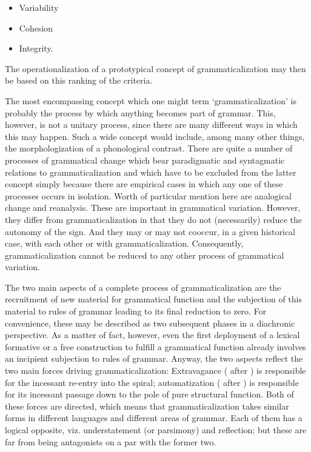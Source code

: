 \begin{itemize}
\item Variability
\item Cohesion
\item Integrity.
\end{itemize}

The operationalization of a prototypical concept of grammaticalization may then be based on this ranking of the criteria.

The most encompassing concept which one might term ‘grammaticalization’ is probably the process by which anything becomes part of grammar. This, however, is not a unitary process, since there are many different ways in which this may happen. Such a wide concept would include, among many other things, the morphologization of a phonological contrast. There are quite a number of processes of grammatical change which bear paradigmatic and syntagmatic relations to grammaticalization and which have to be excluded from the latter concept simply because there are empirical cases in which any one of these processes occurs in isolation. Worth of particular mention here are analogical change and reanalysis. These are important in grammatical variation. However, they differ from grammaticalization in that they do not (necessarily) reduce the autonomy of the sign. And they may or may not cooccur, in a given historical case, with each other or with grammaticalization. Consequently, grammaticalization cannot be reduced to any other process of grammatical variation.

The two main aspects of a complete process of grammaticalization are the recruitment of new material for grammatical function and the subjection of this material to rules of grammar leading to its final reduction to zero. For convenience, these may be described as two subsequent phases in a diachronic perspective. As a matter of fact, however, even the first deployment of a lexical formative or a free construction to fulfill a grammatical function already involves an incipient subjection to rules of grammar. Anyway, the two aspects reflect the two main forces driving grammaticalization: Extravagance (\citealt{Haspelmath1999} after \citealt{Lehmann1975}) is responsible for the incessant re-entry into the spiral; automatization (\citealt{Lehmann2004} after \citealt{Givon1989}) is responsible for its incessant passage down to the pole of pure structural function. Both of these forces are directed, which means that grammaticalization takes similar forms in different languages and different areas of grammar. Each of them has a logical opposite, viz. understatement (or parsimony) and reflection; but these are far from being antagonists on a par with the former two.

